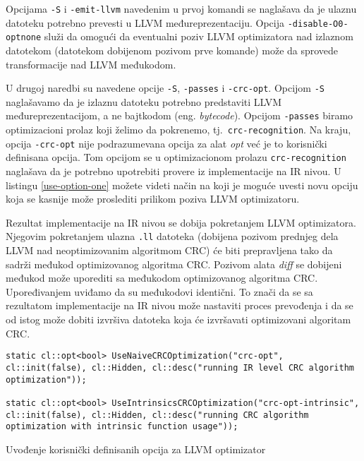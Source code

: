 \documentclass[12pt,oneside]{memoir}
\begin{document}
Opcijama \texttt{-S} i \texttt{-emit-llvm} navedenim u prvoj komandi se naglašava da je ulaznu datoteku potrebno prevesti u LLVM međureprezentaciju. Opcija \texttt{-disable-O0-optnone} služi da omogući da eventualni poziv LLVM optimizatora nad izlaznom datotekom (datotekom dobijenom pozivom prve komande) može da sprovede transformacije nad LLVM međukodom. 

U drugoj naredbi su navedene opcije \texttt{-S}, \texttt{-passes} i \texttt{-crc-opt}. Opcijom \texttt{-S} naglašavamo da je izlaznu datoteku potrebno predstaviti LLVM međureprezentacijom, a ne bajtkodom (eng. \textit{bytecode}). Opcijom \texttt{-passes} biramo optimizacioni prolaz koji želimo da pokrenemo, tj.~\texttt{crc-recognition}. Na kraju, opcija \texttt{-crc-opt} nije podrazumevana opcija za alat \textit{opt} već je to korisnički definisana opcija. Tom opcijom se u optimizacionom prolazu \texttt{crc-recognition} naglašava da je potrebno upotrebiti provere iz implementacije na IR nivou. U listingu \ref{use-option-one} možete videti način na koji je moguće uvesti novu opciju koja se kasnije može proslediti prilikom poziva LLVM optimizatoru.

Rezultat implementacije na IR nivou se dobija pokretanjem LLVM optimizatora.
Njegovim pokretanjem ulazna \texttt{.ll} datoteka (dobijena pozivom prednjeg dela LLVM nad neoptimizovanim algoritmom CRC) će biti prepravljena tako da sadrži međukod optimizovanog algoritma CRC. Pozivom alata \textit{diff} se dobijeni međukod može uporediti sa međukodom optimizovanog algoritma CRC. 
Upoređivanjem uviđamo da su međukodovi identični. To znači da se sa rezultatom implementacije na IR nivou može nastaviti proces prevođenja i da se od istog može dobiti izvršiva datoteka koja će izvršavati optimizovani algoritam CRC.


\begin{listing}[!ht]
\begin{verbatim}
static cl::opt<bool> UseNaiveCRCOptimization("crc-opt", cl::init(false), cl::Hidden, cl::desc("running IR level CRC algorithm optimization"));

static cl::opt<bool> UseIntrinsicsCRCOptimization("crc-opt-intrinsic", cl::init(false), cl::Hidden, cl::desc("running CRC algorithm optimization with intrinsic function usage"));
\end{verbatim}
\caption{Uvođenje korisnički definisanih opcija za LLVM optimizator}
\centering
\label{use-option-one}
\end{listing}
\end{document}
